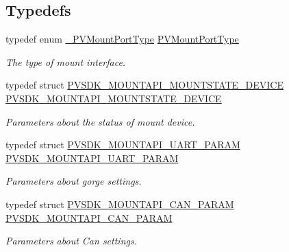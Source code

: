 \subsection*{Typedefs}
\begin{DoxyCompactItemize}
\item 
typedef enum \hyperlink{group___p_v_s_d_k___c_o_r_e___a_p_i___m_o_u_n_t_c_o_n_t_r_o_l_ga67965dabe94c922db72b3ad1f4113b27}{\+\_\+\+P\+V\+Mount\+Port\+Type} \hyperlink{group___p_v_s_d_k___c_o_r_e___a_p_i___m_o_u_n_t_c_o_n_t_r_o_l_ga23d329e18c5af08ae082601596435dad}{P\+V\+Mount\+Port\+Type}
\begin{DoxyCompactList}\small\item\em The type of mount interface. \end{DoxyCompactList}\item 
typedef struct \hyperlink{struct_p_v_s_d_k___m_o_u_n_t_a_p_i___m_o_u_n_t_s_t_a_t_e___d_e_v_i_c_e}{P\+V\+S\+D\+K\+\_\+\+M\+O\+U\+N\+T\+A\+P\+I\+\_\+\+M\+O\+U\+N\+T\+S\+T\+A\+T\+E\+\_\+\+D\+E\+V\+I\+CE} \hyperlink{group___p_v_s_d_k___c_o_r_e___a_p_i___m_o_u_n_t_c_o_n_t_r_o_l_ga6f97450cd7d739bf5eb1a35f49dc1482}{P\+V\+S\+D\+K\+\_\+\+M\+O\+U\+N\+T\+A\+P\+I\+\_\+\+M\+O\+U\+N\+T\+S\+T\+A\+T\+E\+\_\+\+D\+E\+V\+I\+CE}
\begin{DoxyCompactList}\small\item\em Parameters about the status of mount device. \end{DoxyCompactList}\item 
typedef struct \hyperlink{struct_p_v_s_d_k___m_o_u_n_t_a_p_i___u_a_r_t___p_a_r_a_m}{P\+V\+S\+D\+K\+\_\+\+M\+O\+U\+N\+T\+A\+P\+I\+\_\+\+U\+A\+R\+T\+\_\+\+P\+A\+R\+AM} \hyperlink{group___p_v_s_d_k___c_o_r_e___a_p_i___m_o_u_n_t_c_o_n_t_r_o_l_ga056c07a3fe83faf65439d64e4f1f09e0}{P\+V\+S\+D\+K\+\_\+\+M\+O\+U\+N\+T\+A\+P\+I\+\_\+\+U\+A\+R\+T\+\_\+\+P\+A\+R\+AM}
\begin{DoxyCompactList}\small\item\em Parameters about gorge settings. \end{DoxyCompactList}\item 
typedef struct \hyperlink{struct_p_v_s_d_k___m_o_u_n_t_a_p_i___c_a_n___p_a_r_a_m}{P\+V\+S\+D\+K\+\_\+\+M\+O\+U\+N\+T\+A\+P\+I\+\_\+\+C\+A\+N\+\_\+\+P\+A\+R\+AM} \hyperlink{group___p_v_s_d_k___c_o_r_e___a_p_i___m_o_u_n_t_c_o_n_t_r_o_l_ga5b53941c83f5dd846602c9d04bae5ac2}{P\+V\+S\+D\+K\+\_\+\+M\+O\+U\+N\+T\+A\+P\+I\+\_\+\+C\+A\+N\+\_\+\+P\+A\+R\+AM}
\begin{DoxyCompactList}\small\item\em Parameters about Can settings. \end{DoxyCompactList}\item 

\end{DoxyCompactItemize}
